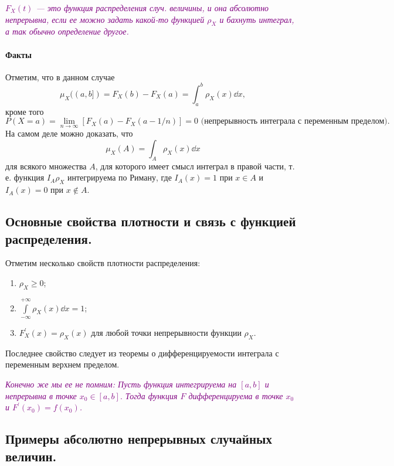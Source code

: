 \textcolor{purple}{\it $F_X(t)$ --- это функция распределения случ. величины, и она абсолютно непрерывна, если ее можно задать какой-то функцией $\rho_X$ и бахнуть интеграл, а так обычно определение другое.}

\paragraph{Факты}
Отметим, что в данном случае
\[
    \mu_X((a, b]) = F_X(b) - F_X(a) = \int_a^b \rho_X(x) \dd x,
\]
кроме того
\[
    P(X = a) = \lim\limits_{n \to \infty}[F_X(a) - F_X(a - 1/n)] = 0 \text{ (непрерывность интеграла с переменным пределом).}
\]
На самом деле можно доказать, что
\[
    \mu_X(A) = \int_A \rho_X(x) \dd x
\]
для всякого множества $A$, для которого имеет смысл интеграл в правой части, т. е. функция $I_A \rho_X$ интегрируема по Риману, где $I_A(x) = 1$ при $x \in A$ и $I_A(x) = 0$ при $x \notin A$.

\sectionbreak
\subsection{Основные свойства плотности и связь с функцией распределения.}

\begin{proposal*}
    Отметим несколько свойств плотности распределения:
    \begin{enumerate}
        \item $\rho_X \geqslant 0$;
        \item $\displaystyle\int\limits_{-\infty}^{+\infty} \rho_X(x) \dd x = 1$;
        \item $F_X^{\prime}(x) = \rho_X(x)$ для любой точки непрерывности функции $\rho_X$.
    \end{enumerate}
\end{proposal*}

Последнее свойство следует из теоремы о дифференцируемости интеграла с переменным верхнем пределом.

\textcolor{purple}{\it Конечно же мы ее не помним: Пусть функция  интегрируема на $[a, b]$ и непрерывна в точке $x_{0} \in [a, b].$
Тогда функция $F$ дифференцируема в точке $x_0$ и $F^{\prime}(x_{0}) = f(x_{0})$.}

\sectionbreak
\subsection{Примеры абсолютно непрерывных случайных величин.}


